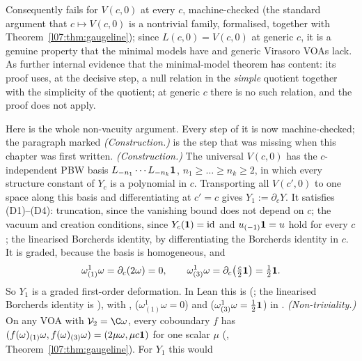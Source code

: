 \begin{warning}
Consequently  fails for $V(c,0)$ at every $c$, machine-checked (the standard argument
that $c\mapsto V(c,0)$ is a nontrivial family, formalised, together with
Theorem~\ref{l07:thm:gaugeline}); since $L(c,0) = V(c,0)$ at generic $c$, it is a
genuine property that the minimal models have and generic Virasoro VOAs lack. As further internal
evidence that the minimal-model theorem has content: its proof uses, at the decisive step, a null
relation in the \emph{simple} quotient together with the simplicity of the quotient; at generic $c$
there is no such relation, and the proof does not apply.
\end{warning}

\begin{remark}\label{l07:rem:nonvacuity}
Here is the whole non-vacuity argument. Every step of it is now machine-checked; the paragraph marked
\emph{(Construction.)} is the step that was missing when this chapter was first written.
\emph{(Construction.)} The universal $V(c,0)$ has the $c$-independent PBW basis
$L_{-n_1}\cdots L_{-n_k}\mathbf{1}$, $n_1\ge\dots\ge n_k\ge2$, in which every structure constant of $Y_c$ is a
polynomial in $c$. Transporting all $V(c',0)$ to one space along this basis and differentiating at $c' = c$
gives $Y_1 := \partial_cY$. It satisfies (D1)--(D4): truncation, since the vanishing bound does not depend on
$c$; the vacuum and creation conditions, since $Y_c(\mathbf{1}) = \mathrm{id}$ and $u_{(-1)}\mathbf{1} = u$ hold for
every $c$; the linearised Borcherds identity, by differentiating the Borcherds identity in $c$. It is graded,
because the basis is homogeneous, and
\begin{equation*}
 \omega^1_{(1)}\omega = \partial_c(2\omega) = 0,\qquad \omega^1_{(3)}\omega = \partial_c\big(\tfrac c2\mathbf{1}\big) = \tfrac12\mathbf{1} .
\end{equation*}
So $Y_1$ is a graded first-order deformation. In Lean this is \allowbreak{}\allowbreak{}
(; the linearised Borcherds identity is ), with
,  ($\omega^1_{(1)}\omega = 0$) and 
($\omega^1_{(3)}\omega = \frac12\mathbf{1}$) in . \emph{(Non-triviality.)} On any VOA with $\lsevenV_2 = \C\omega$, every
coboundary $f$ has $(f(\omega)_{(1)}\omega, f(\omega)_{(3)}\omega) = (2\mu\omega,\mu c\mathbf{1})$ for one scalar $\mu$
(, Theorem~\ref{l07:thm:gaugeline}). For $Y_1$ this would

\end{remark}

